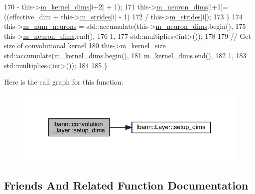 \begin{DoxyCode}
170                                  - this->\hyperlink{classlbann_1_1base__convolution__layer_a283edb6a476f975e713d0b4235ac658f}{m\_kernel\_dims}[i+2] + 1);
171       this->\hyperlink{classlbann_1_1Layer_abb34bb8031f57a483e2e327a5f229f48}{m\_neuron\_dims}[i+1]= ((effective\_dim + this->\hyperlink{classlbann_1_1base__convolution__layer_a2429495822363e41f1f6b96a6b430445}{m\_strides}[i] - 1)
172                                  / this->\hyperlink{classlbann_1_1base__convolution__layer_a2429495822363e41f1f6b96a6b430445}{m\_strides}[i]);
173     \}
174     this->\hyperlink{classlbann_1_1Layer_a6b5ebc8a7d9329d8a773ed787e7b41d8}{m\_num\_neurons} = std::accumulate(this->\hyperlink{classlbann_1_1Layer_abb34bb8031f57a483e2e327a5f229f48}{m\_neuron\_dims}.begin(),
175                                           this->\hyperlink{classlbann_1_1Layer_abb34bb8031f57a483e2e327a5f229f48}{m\_neuron\_dims}.end(),
176                                           1,
177                                           std::multiplies<int>());
178 
179     \textcolor{comment}{// Get size of convolutional kernel}
180     this->\hyperlink{classlbann_1_1base__convolution__layer_aa9da3e44499643a86bd611b5eb500dd4}{m\_kernel\_size} = std::accumulate(\hyperlink{classlbann_1_1base__convolution__layer_a283edb6a476f975e713d0b4235ac658f}{m\_kernel\_dims}.begin(),
181                                           \hyperlink{classlbann_1_1base__convolution__layer_a283edb6a476f975e713d0b4235ac658f}{m\_kernel\_dims}.end(),
182                                           1,
183                                           std::multiplies<int>());
184 
185   \}
\end{DoxyCode}
Here is the call graph for this function\+:\nopagebreak
\begin{figure}[H]
\begin{center}
\leavevmode
\includegraphics[width=344pt]{classlbann_1_1convolution__layer_adbb45d032ad79c793a159b7ee79eef14_cgraph}
\end{center}
\end{figure}


\subsection{Friends And Related Function Documentation}
\mbox{\label{classlbann_1_1convolution__layer_a6d54673503b45aeb6526f041224900c6}} 

